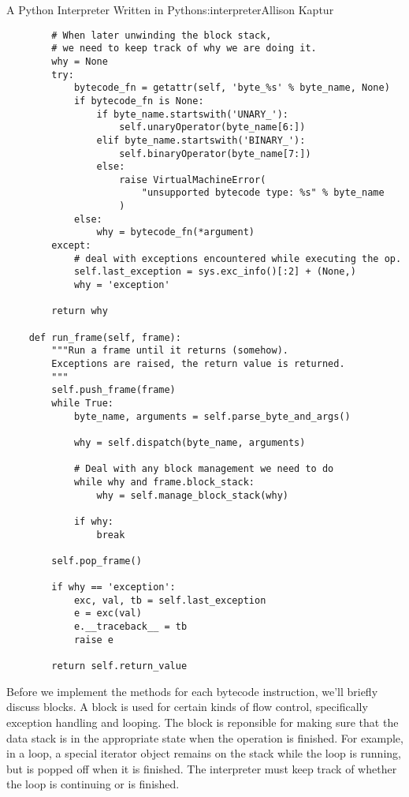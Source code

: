 \begin{aosachapter}{A Python Interpreter Written in Python}{s:interpreter}{Allison Kaptur}
\begin{verbatim}
        # When later unwinding the block stack,
        # we need to keep track of why we are doing it.
        why = None
        try:
            bytecode_fn = getattr(self, 'byte_%s' % byte_name, None)
            if bytecode_fn is None:
                if byte_name.startswith('UNARY_'):
                    self.unaryOperator(byte_name[6:])
                elif byte_name.startswith('BINARY_'):
                    self.binaryOperator(byte_name[7:])
                else:
                    raise VirtualMachineError(
                        "unsupported bytecode type: %s" % byte_name
                    )
            else:
                why = bytecode_fn(*argument)
        except:
            # deal with exceptions encountered while executing the op.
            self.last_exception = sys.exc_info()[:2] + (None,)
            why = 'exception'

        return why

    def run_frame(self, frame):
        """Run a frame until it returns (somehow).
        Exceptions are raised, the return value is returned.
        """
        self.push_frame(frame)
        while True:
            byte_name, arguments = self.parse_byte_and_args()

            why = self.dispatch(byte_name, arguments)

            # Deal with any block management we need to do
            while why and frame.block_stack:
                why = self.manage_block_stack(why)

            if why:
                break

        self.pop_frame()

        if why == 'exception':
            exc, val, tb = self.last_exception
            e = exc(val)
            e.__traceback__ = tb
            raise e

        return self.return_value
\end{verbatim}

\label{the-block-class}

Before we implement the methods for each bytecode instruction, we'll
briefly discuss blocks. A block is used for certain kinds of flow
control, specifically exception handling and looping. The block is
reponsible for making sure that the data stack is in the appropriate
state when the operation is finished. For example, in a loop, a special
iterator object remains on the stack while the loop is running, but is
popped off when it is finished. The interpreter must keep track of
whether the loop is continuing or is finished.


\end{aosachapter}
